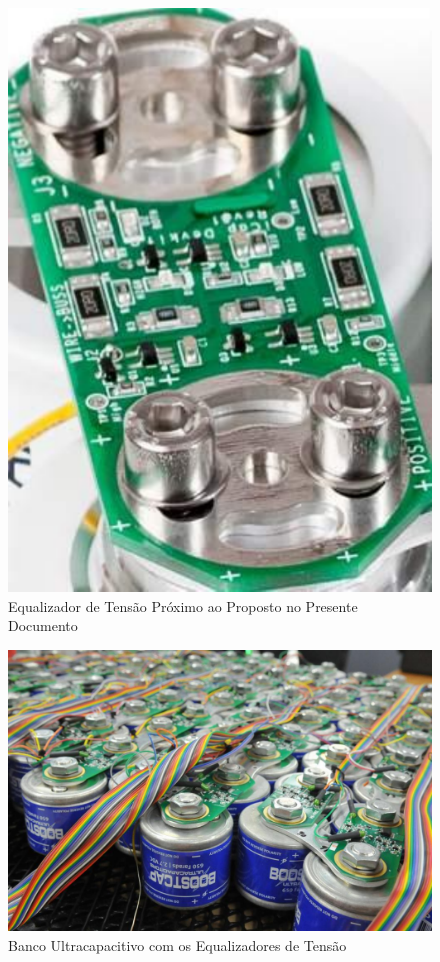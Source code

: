 \documentclass[11pt, a4paper, oneside]{article}
\begin{document}
\begin{figure}[h!]
\centering
\includegraphics[width=0.55\linewidth]{equlizador_de_tensao}
\caption{Equalizador de Tensão Próximo ao Proposto no Presente Documento}
\label{fig:topologia_dos_equlizadores_utilizados_no_presente_trabalho}
\end{figure}

\begin{figure}[h!]
\centering
\includegraphics[width=0.9\linewidth]{ultracapacitor_banck}
\caption{Banco Ultracapacitivo com os Equalizadores de Tensão \cite{banco_ultracapacitivo}}
\label{fig:topologia_dos_equlizadores_utilizados_no_presente_trabalho}
\end{figure}

\newpage
\end{document}
